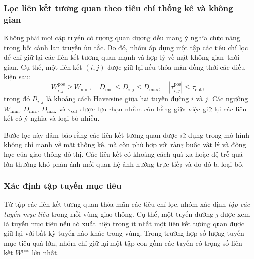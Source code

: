 \subsubsection{Lọc liên kết tương quan theo tiêu chí thống kê và không gian}
\label{subsubsec:link_filtering}

Không phải mọi cặp tuyến có tương quan dương đều mang ý nghĩa chức năng trong bối cảnh lan
truyền ùn tắc. Do đó, nhóm áp dụng một tập các tiêu chí lọc để chỉ giữ lại các liên kết
tương quan mạnh và hợp lý về mặt không gian--thời gian. Cụ thể, một liên kết $(i,j)$ được giữ
lại nếu thỏa mãn đồng thời các điều kiện sau:
\begin{equation}
W^{\text{pos}}_{i,j} \geq W_{\min}, \quad
D_{\min} \leq D_{i,j} \leq D_{\max}, \quad
|\tau^{\text{pos}}_{i,j}| \leq \tau_{\text{cut}},
\end{equation}
trong đó $D_{i,j}$ là khoảng cách Haversine giữa hai tuyến đường $i$ và $j$. Các ngưỡng
$W_{\min}$, $D_{\min}$, $D_{\max}$ và $\tau_{\text{cut}}$ được lựa chọn nhằm cân bằng giữa
việc giữ lại các liên kết có ý nghĩa và loại bỏ nhiễu.

Bước lọc này đảm bảo rằng các liên kết tương quan được sử dụng trong mô hình không chỉ mạnh
về mặt thống kê, mà còn phù hợp với ràng buộc vật lý và động học của giao thông đô thị. Các
liên kết có khoảng cách quá xa hoặc độ trễ quá lớn thường khó phản ánh mối quan hệ ảnh hưởng
trực tiếp và do đó bị loại bỏ.

\subsubsection{Xác định tập tuyến mục tiêu}
\label{subsubsec:target_mask}

Từ tập các liên kết tương quan thỏa mãn các tiêu chí lọc, nhóm xác định \textit{tập các
tuyến mục tiêu} trong mỗi vùng giao thông. Cụ thể, một tuyến đường $j$ được xem là tuyến
mục tiêu nếu nó xuất hiện trong ít nhất một liên kết tương quan được giữ lại với bất kỳ tuyến
nào khác trong vùng. Trong trường hợp số lượng tuyến mục tiêu quá lớn, nhóm chỉ giữ lại
một tập con gồm các tuyến có trọng số liên kết $W^{\text{pos}}$ lớn nhất.

